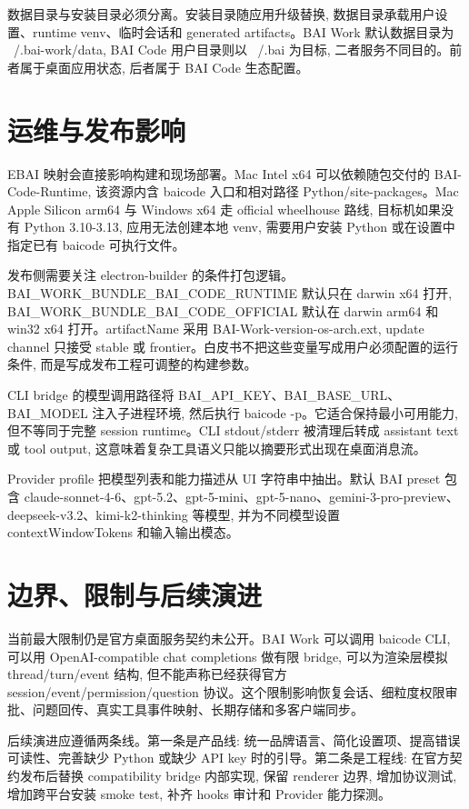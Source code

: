 数据目录与安装目录必须分离。安装目录随应用升级替换, 数据目录承载用户设置、runtime venv、临时会话和 generated artifacts。BAI Work 默认数据目录为 ~/.bai-work/data, BAI Code 用户目录则以 ~/.bai 为目标, 二者服务不同目的。前者属于桌面应用状态, 后者属于 BAI Code 生态配置。

\section{运维与发布影响}
EBAI 映射会直接影响构建和现场部署。Mac Intel x64 可以依赖随包交付的 BAI-Code-Runtime, 该资源内含 baicode 入口和相对路径 Python/site-packages。Mac Apple Silicon arm64 与 Windows x64 走 official wheelhouse 路线, 目标机如果没有 Python 3.10-3.13, 应用无法创建本地 venv, 需要用户安装 Python 或在设置中指定已有 baicode 可执行文件。

发布侧需要关注 electron-builder 的条件打包逻辑。BAI\_WORK\_BUNDLE\_BAI\_CODE\_RUNTIME 默认只在 darwin x64 打开, BAI\_WORK\_BUNDLE\_BAI\_CODE\_OFFICIAL 默认在 darwin arm64 和 win32 x64 打开。artifactName 采用 BAI-Work-{version}-{os}-{arch}.{ext}, update channel 只接受 stable 或 frontier。白皮书不把这些变量写成用户必须配置的运行条件, 而是写成发布工程可调整的构建参数。

CLI bridge 的模型调用路径将 BAI\_API\_KEY、BAI\_BASE\_URL、BAI\_MODEL 注入子进程环境, 然后执行 baicode -p。它适合保持最小可用能力, 但不等同于完整 session runtime。CLI stdout/stderr 被清理后转成 assistant text 或 tool output, 这意味着复杂工具语义只能以摘要形式出现在桌面消息流。

Provider profile 把模型列表和能力描述从 UI 字符串中抽出。默认 BAI preset 包含 claude-sonnet-4-6、gpt-5.2、gpt-5-mini、gpt-5-nano、gemini-3-pro-preview、deepseek-v3.2、kimi-k2-thinking 等模型, 并为不同模型设置 contextWindowTokens 和输入输出模态。

\section{边界、限制与后续演进}
当前最大限制仍是官方桌面服务契约未公开。BAI Work 可以调用 baicode CLI, 可以用 OpenAI-compatible chat completions 做有限 bridge, 可以为渲染层模拟 thread/turn/event 结构, 但不能声称已经获得官方 session/event/permission/question 协议。这个限制影响恢复会话、细粒度权限审批、问题回传、真实工具事件映射、长期存储和多客户端同步。

后续演进应遵循两条线。第一条是产品线: 统一品牌语言、简化设置项、提高错误可读性、完善缺少 Python 或缺少 API key 时的引导。第二条是工程线: 在官方契约发布后替换 compatibility bridge 内部实现, 保留 renderer 边界, 增加协议测试, 增加跨平台安装 smoke test, 补齐 hooks 审计和 Provider 能力探测。

